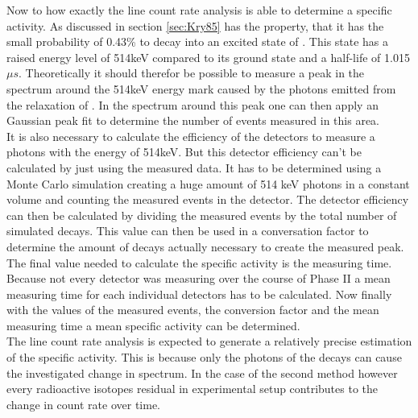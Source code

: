 Now to how exactly the line count rate analysis is able to determine a specific activity.
As discussed in section \ref{sec:Kry85} has \Kr the property, that it has the small probability of 0.43\% to decay into an excited state of . 
This state has a raised energy level of 514keV compared to its ground state and a half-life of 1.015\(\unit{\mu s}\). 
Theoretically it should therefor be possible to measure a peak in the spectrum around the 514keV energy mark caused by the photons emitted from the relaxation of .
In the spectrum around this peak one can then apply an Gaussian peak fit to determine the number of events measured in this area. 
\\

It is also necessary to calculate the efficiency of the detectors to measure a photons with the energy of 514keV.
But this detector efficiency can't be calculated by just using the measured data.
It has to be determined using a Monte Carlo simulation creating a huge amount of 514 keV photons in a constant volume and counting the measured events in the detector. 
The detector efficiency can then be calculated by dividing the measured events by the total number of simulated decays.
This value can then be used in a conversation factor to determine the amount of decays actually necessary to create the measured peak.
\\

The final value needed to calculate the specific activity is the measuring time.
Because not every detector was measuring over the course of Phase II a mean measuring time for each individual detectors has to be calculated.
Now finally with the values of the measured events, the conversion factor and the mean measuring time a mean specific activity can be determined. 
\\

The line count rate analysis is expected to generate a relatively precise estimation of the specific activity.
This is because only the photons of the \Kr decays can cause the investigated change in spectrum.
In the case of the second method however every radioactive isotopes residual in experimental setup contributes to the change in count rate over time.
\\ 

